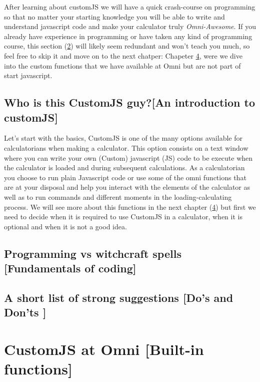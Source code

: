 \documentclass[11pt,a4paper,oldfontcommands]{memoir}
\begin{document}
After learning about customJS we will have a quick crash-course on programming so that no matter your starting knowledge you will be able to write and understand javascript code and make your calculator truly \textit{Omni-Awesome}\textsuperscript{\textregistered}. If you already have experience in programming or have taken any kind of programming course, this section (\ref{sec:fundamentals}) will likely seem redundant and won't teach you much, so feel free to skip it and move on to the next chatper: Chapeter \ref{chap:omni}, were we dive into the custom functions that we have available at Omni but are not part of start javascript.
    
    \section{Who is this CustomJS guy?\small[An introduction to customJS]}
        \label{sec:whatIs}
    Let's start with the basics, CustomJS is one of the many options available for calculatorians when making a calculator. This option consists on a text window where you can write your own (Custom) javascript (JS) code to be execute when the calculator is loaded and during subsequent calculations. 
    As a calculatorian you choose to run plain Javascript code or use some of the omni functions that are at your disposal and help you interact with the elements of the calculator as well as to run commands and different moments in the loading-calculating process. We will see more about this functions in the next chapter (\ref{chap:omni}) but first we need to decide when it is required to use CustomJS in a calculator, when it is optional and when it is not a good idea.
    
        
    
    
    
    \section{Programming vs witchcraft spells \small[Fundamentals of coding]}    
        \label{sec:fundamentals}
        
    
    \section{A short list of strong suggestions \small{[Do's and Don'ts ]}}
        \label{sec:suggestions}
        

\chapter{CustomJS at Omni \small{[Built-in functions]}}
    \label{chap:omni}
    
\end{document}
